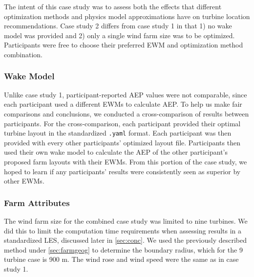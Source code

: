 The intent of this case study was to assess both the effects that different optimization methods and physics model approximations have on turbine location recommendations.
Case study 2 differs from case study 1 in that 1) no wake model was provided and 2) only a single wind farm size was to be optimized.
Participants were free to choose their preferred EWM and optimization method combination.

\subsubsection{Wake Model}
Unlike case study 1, participant-reported AEP values were not comparable, since each participant used a different EWMs to calculate AEP. %
To help us make fair comparisons and conclusions, we conducted a cross-comparison of results between participants.
For the cross-comparison, each participant provided their optimal turbine layout in the standardized \texttt{.yaml} format. Each participant was then provided with every other participants' optimized layout file.
Participants then used their own wake model to calculate the AEP of the other participant's proposed farm layouts with their EWMs.
From this portion of the case study, we hoped to learn if any participants' results were consistently seen as superior by other EWMs.

\subsubsection{Farm Attributes}
The wind farm size for the combined case study was limited to nine turbines.
We did this to limit the computation time requirements when assessing results in a standardized LES, discussed later in \cref{sec:conc}.
We used the previously described method under \cref{sec:farmgeog} to determine the boundary radius, which for the 9 turbine case is 900 m.
The wind rose and wind speed were the same as in case study 1.